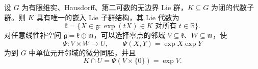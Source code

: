 \begin{theorem}[闭子群定理]\label{g1:thm:closed-subgroup}
	设 \(G\) 为有限维实、Hausdorff、第二可数的无边界 Lie 群，\(K\subseteq G\) 为闭的代数子群。则 \(K\) 具有唯一的嵌入 Lie 子群结构，其 Lie 代数为
	\begin{equation}\label{g1:eq:closed-subgroup-lie-algebra}
		\mathfrak k=\{X\in\mathfrak g:\exp(tX)\in K\text{ 对所有 }t\in\mathbb R\}.
	\end{equation}
	对任意线性补空间 \(\mathfrak g=\mathfrak k\oplus\mathfrak m\)，可以选择零点的邻域 \(V\subseteq\mathfrak k\)、\(W\subseteq\mathfrak m\)，使
	\[
		\Psi:V\times W\longrightarrow U,\qquad \Psi(X,Y)=\exp X\exp Y
	\]
	为到 \(G\) 中单位元开邻域的微分同胚，并且
	\begin{equation}\label{g1:eq:closed-subgroup-local-slice}
		K\cap U=\Psi(V\times\{0\})=\exp V.
	\end{equation}
\end{theorem}
